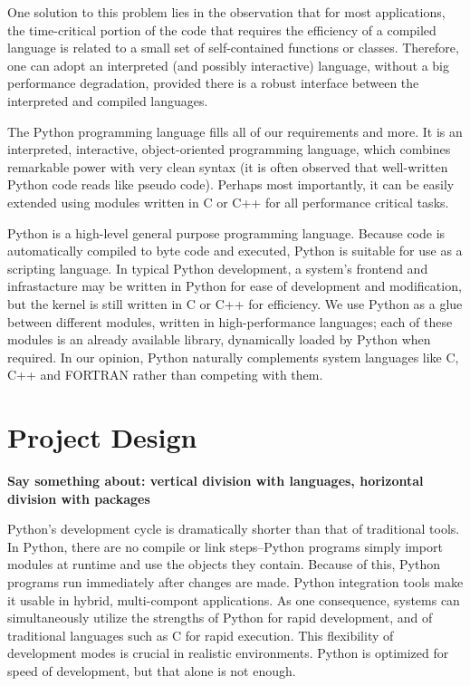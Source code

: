 \documentclass[10pt,relax]{SANDreport}
\begin{document}
One solution to this problem lies in the observation that for most
applications, the time-critical portion of the code that requires the
efficiency of a compiled language is related to a small set of
self-contained functions or classes. Therefore, one can adopt an
interpreted (and possibly interactive) language, without a big
performance degradation, provided there is a robust interface between
the interpreted and compiled languages.

The Python programming language fills all of our requirements and
more.  It is an interpreted, interactive, object-oriented programming
language, which combines remarkable power with very clean syntax (it
is often observed that well-written Python code reads like pseudo
code).  Perhaps most importantly, it can be easily extended using
modules written in C or C++ for all performance critical tasks.

\smallskip

Python is a high-level general purpose programming language. Because
code is automatically compiled to byte code and executed, Python is
suitable for use as a scripting language.  In typical Python
development, a system's frontend and infrastacture may be written in
Python for ease of development and modification, but the kernel is
still written in C or C++ for efficiency.  We use Python as a glue
between different modules, written in high-performance languages; each
of these modules is an already available library, dynamically loaded
by Python when required.  In our opinion, Python naturally complements
system languages like C, C++ and FORTRAN rather than competing with
them.

\smallskip


\section{Project Design}
\label{sec:design}

{\bf Say something about: vertical division with languages, horizontal
  division with packages}

\bigskip

Python's development cycle is dramatically shorter than that of
traditional tools. In Python, there are no compile or link
steps--Python programs simply import modules at runtime and use the
objects they contain. Because of this, Python programs run immediately
after changes are made. Python integration tools make it usable in
hybrid, multi-compont applications. As one consequence, systems can
simultaneously utilize the strengths of Python for rapid development,
and of traditional languages such as C for rapid execution.  This
flexibility of development modes is crucial in realistic environments.
Python is optimized for speed of development, but that alone is not
enough.
\end{document}
